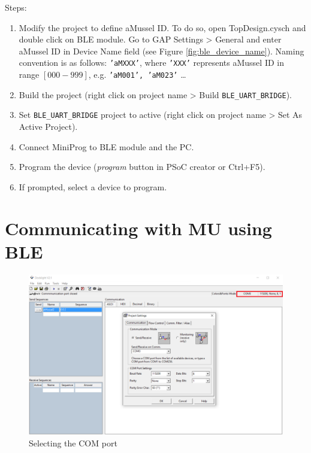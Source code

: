Steps:
\begin{enumerate}
	\item Modify the project to define aMussel ID. To do so, open TopDesign.cysch and double click on BLE module. Go to GAP Settings > General and enter aMussel ID in Device Name field (see Figure \ref{fig:ble_device_name}). Naming convention is as follows: \texttt{'aMXXX'}, where \texttt{'XXX'} represents aMussel ID in range $[000-999]$, e.g. \texttt{'aM001', 'aM023'} \ldots
	\item Build the project (right click on project name > Build \texttt{BLE\_UART\_BRIDGE}).
	\item Set \texttt{BLE\_UART\_BRIDGE} project to active (right click on project name > Set As Active Project).
	\item Connect MiniProg to BLE module and the PC.
	\item Program the device (\textit{program} button in PSoC creator or Ctrl+F5).
	\item If prompted, select a device to program.
\end{enumerate}

\section{Communicating with MU using BLE}

\begin{figure}[htb]
    \centering
	  \includegraphics[width=\linewidth]{figures/Docklight_COM.PNG}
	\caption{Selecting the COM port}
	\label{fig:docklight_com}
\end{figure}

